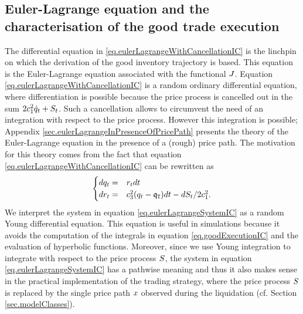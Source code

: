 \documentclass[10pt,a4paper]{article}
\begin{document}
\subsection{Euler-Lagrange equation and the characterisation of the good trade execution}\label{sec.eulerLagrangeIC}
The differential equation in \eqref{eq.eulerLagrangeWithCancellationIC} is the linchpin on which the derivation of the good inventory trajectory is based. This equation is the Euler-Lagrange equation associated with the functional $J$. Equation \eqref{eq.eulerLagrangeWithCancellationIC} is a random ordinary differential equation, where differentiation is possible because the price process is cancelled out in the sum $ 2c_{1}^{2} \dot{q}_{t} + S_t$. Such a cancellation allows to circumvent the need of an integration with respect to the price process. However this integration is possible; Appendix \ref{sec.eulerLagrangeInPresenceOfPricePath} presents the theory of the Euler-Lagrange equation in the presence of a (rough) price path. The motivation for this theory comes from the fact that equation \eqref{eq.eulerLagrangeWithCancellationIC} can be rewritten as 
\begin{equation}\label{eq.eulerLagrangeSystemIC}
\begin{cases}
dq_t=& r_t dt \\
dr_t=& c_{3}^{2} (q_t - \mathfrak{q}_{\mathtt{T} })dt - dS_t/2c_{1}^{2}.
\end{cases}
\end{equation}
We interpret the system in equation \eqref{eq.eulerLagrangeSystemIC} as a random Young differential equation. This equation  is useful in simulations because it avoids the computation of the integrals in equation \eqref{eq.goodExecutionIC} and the evaluation of hyperbolic functions. Moreover, since we use Young integration to integrate with respect to the price process $S$, the system in equation \eqref{eq.eulerLagrangeSystemIC} has a pathwise meaning and thus it also makes sense in the practical implementation of the trading strategy, where the price process $S$ is replaced by the single price path $x$ observed during the liquidation (cf. Section \ref{sec.modelClasses}). 
\end{document}
